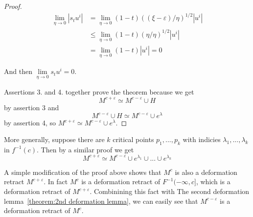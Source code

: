 \begin{proof}
   \begin{align*}
      \lim\limits_{\eta \to 0} | s_t u^i |
         & = \lim\limits_{\eta \to 0} (1 - t)((\xi - \varepsilon)/\eta)^{1/2} | u^i | \\
         & \leq \lim\limits_{\eta \to 0} (1 - t)(\eta/\eta)^{1/2}|u^i| \\
         & = \lim\limits_{\eta \to 0} (1 - t)|u^i| = 0 
   \end{align*}

   And then $\lim\limits_{\eta \to 0} s_t u^i = 0$.
   
   Assertions 3. and 4. together prove the theorem because we get 
   \[ M^{c + \varepsilon} \simeq M^{c-\varepsilon} \cup H \]
   by assertion 3 and
   \[ M^{c-\varepsilon} \cup H \simeq M^{c - \varepsilon} \cup e^{\lambda} \]
   by assertion 4, so $M^{c + \varepsilon} \simeq M^{c - \varepsilon} \cup e^{\lambda}$.
 \end{proof}

\begin{remark}[Milnor]
   More generally, suppose there are $k$ critical points $p_1, ..., p_k$ with 
   indicies $\lambda_1, ..., \lambda_k$ in $f^{-1}(c)$. Then by a similar proof
   we get
   \[ 
      M^{c + \varepsilon} \simeq 
      M^{c - \varepsilon} \cup e^{\lambda_1} \cup ... \cup e^{\lambda_k} 
   \]
\end{remark}

\begin{remark}[Milnor]
   A simple modification of the proof above shows that $M^c$ is also a deformation
   retract $M^{c + \varepsilon}$. In fact $M^c$ is a deformation retract of 
   $F^{-1}(-\infty, c]$, which is a deformation retract of $M^{c + \varepsilon}$.
   Combinining this fact with The second deformation 
   lemma~\ref{theorem:2nd deformation lemma}, we can easily see that 
   $M^{c - \varepsilon}$ is a deformation retract of $M^c$.
\end{remark}
